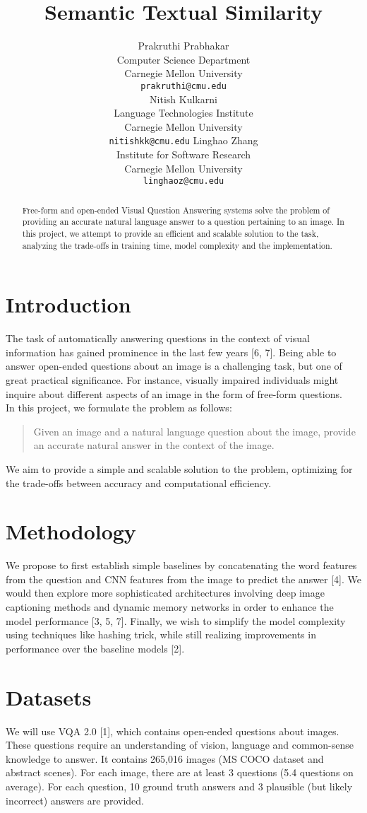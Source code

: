 \documentclass{article}
\title{Semantic Textual Similarity}
\author{
  Prakruthi Prabhakar\\
  Computer Science Department\\
  Carnegie Mellon University\\
  \texttt{prakruthi@cmu.edu} \\
  \And
  Nitish Kulkarni\\
  Language Technologies Institute\\
  Carnegie Mellon University\\
  \texttt{nitishkk@cmu.edu}
  \And
  Linghao Zhang\\
  Institute for Software Research\\
  Carnegie Mellon University\\
  \texttt{linghaoz@cmu.edu}
}
\begin{document}
\maketitle

\begin{abstract}
	Free-form and open-ended Visual Question Answering systems solve the problem of providing an accurate natural language answer to a question pertaining to an image. In this project, we attempt to provide an efficient and scalable solution to the task, analyzing the trade-offs in training time, model complexity and the implementation.
\end{abstract}

\section{Introduction}
The task of automatically answering questions in the context of visual information has gained prominence in the last few years [6, 7]. Being able to answer open-ended questions about an image is a challenging task, but one of great practical significance. For instance, visually impaired individuals might inquire about different aspects of an image in the form of free-form questions.\\
In this project, we formulate the problem as follows:
\begin{quotation}
Given an image and a natural language question about the image, provide an accurate natural answer in the context of the image.
\end{quotation}
We aim to provide a simple and scalable solution to the problem, optimizing for the trade-offs between accuracy and computational efficiency. 

\section{Methodology}

We propose to first establish simple baselines by concatenating the word features from the question and CNN features from the image to predict the answer [4]. We would then explore more sophisticated architectures involving deep image captioning methods and dynamic memory networks in order to enhance the model performance [3, 5, 7]. Finally, we wish to simplify the model complexity using techniques like hashing trick, while still realizing improvements in performance over the baseline models [2].

\section{Datasets}
We will use VQA 2.0 [1], which contains open-ended questions about images. These questions require an understanding of vision, language and common-sense knowledge to answer. It contains 265,016 images (MS COCO dataset and abstract scenes). For each image, there are at least 3 questions (5.4 questions on average). For each question, 10 ground truth answers and 3 plausible (but likely incorrect) answers are provided.
\end{document}
